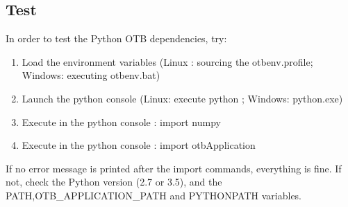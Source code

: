 \documentclass[10pt,a4paper]{article}
\begin{document}
\subsection{Test}
In order to test the Python OTB dependencies, try:
\begin{enumerate}
\item Load the environment variables (Linux : sourcing the otbenv.profile; Windows: executing otbenv.bat) 
\item Launch the python console (Linux: execute python ; Windows: python.exe)
\item Execute in the python console : import numpy
\item Execute in the python console : import otbApplication
\end{enumerate}
If no error message is printed after the import commands, everything is fine. If not, check the Python version (2.7 or 3.5), and the PATH,OTB\_APPLICATION\_PATH and PYTHONPATH variables.
\end{document}
